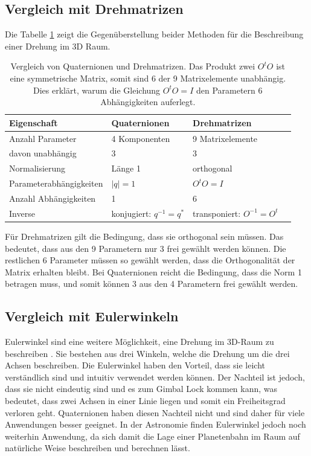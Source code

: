 \subsection{Vergleich mit Drehmatrizen}
Die Tabelle \ref{qa:tab:vergleich} zeigt die 
Gegenüberstellung beider Methoden für die Beschreibung einer 
Drehung im 3D Raum.
\begin{table}
        \centering
        \small
        \begin{tabular}{llll}
            \textbf{Eigenschaft} & \textbf{Quaternionen} & \textbf{Drehmatrizen}\\
            \hline
            Anzahl Parameter        & 4 Komponenten & 9 Matrixelemente  \\
	    davon unabhängig        & 3             & 3             \\
            Normalisierung          & Länge 1       & orthogonal    \\
            Parameterabhängigkeiten & $|q| = 1$     & $O^tO=I$      \\
            Anzahl Abhängigkeiten   & 1             & 6             \\
            Inverse                 & konjugiert: $q^{-1}=q^*$   & transponiert: $O^{-1}=O^t$  \\
            \hline
        \end{tabular}
        \caption{Vergleich von Quaternionen und Drehmatrizen.
	Das Produkt zwei $O^tO$ ist eine symmetrische Matrix, somit
	sind 6 der 9 Matrixelemente unabhängig. Dies erklärt, warum
	die Gleichung $O^tO=I$ den Parametern 6 Abhängigkeiten
        auferlegt.}
        \label{qa:tab:vergleich}
\end{table}
Für Drehmatrizen gilt die Bedingung, dass sie orthogonal sein 
müssen. Das bedeutet, dass aus den 9 Parametern nur 3 frei gewählt 
werden können. Die restlichen 6 Parameter müssen so gewählt werden, 
dass die Orthogonalität der Matrix erhalten bleibt. Bei 
Quaternionen reicht die Bedingung, dass die Norm 1 betragen muss, 
und somit können 3 aus den 4 Parametern frei gewählt werden.

\subsection{Vergleich mit Eulerwinkeln}
Eulerwinkel sind eine weitere Möglichkeit, eine Drehung im 3D-Raum 
%
zu beschreiben \cite[pp.~511-516]{qa:linalg}. Sie bestehen aus drei Winkeln, welche die Drehung 
um die drei Achsen beschreiben. Die Eulerwinkel haben den Vorteil, 
dass sie leicht verständlich sind und intuitiv verwendet werden 
können. Der Nachteil ist jedoch, dass sie nicht eindeutig sind und 
es zum Gimbal Lock kommen kann, was bedeutet, dass zwei Achsen in 
%
einer Linie liegen und somit ein Freiheitsgrad verloren geht. 
Quaternionen haben diesen Nachteil nicht und sind daher für viele 
Anwendungen besser geeignet. In der Astronomie finden Eulerwinkel 
%
jedoch noch weiterhin Anwendung, da sich damit die Lage einer 
Planetenbahn im Raum auf natürliche Weise beschreiben und berechnen
%
lässt.
